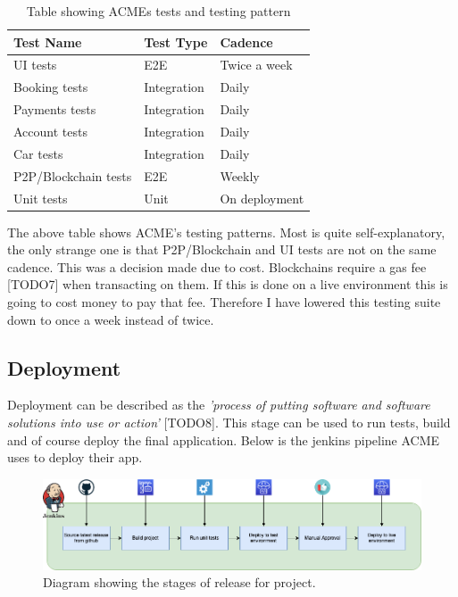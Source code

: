   \begin{table}[H]
    \centering
    \begin{tabular}{|l|l|l|}
      \hline
      \textbf{Test Name}    & \textbf{Test Type}  & \textbf{Cadence}  \\ \hline
      UI tests              & E2E                 & Twice a week      \\ \hline
      Booking tests         & Integration         & Daily             \\ \hline
      Payments tests        & Integration         & Daily             \\ \hline     
      Account tests         & Integration         & Daily             \\ \hline     
      Car tests             & Integration         & Daily             \\ \hline   
      P2P/Blockchain tests  & E2E                 & Weekly            \\ \hline 
      Unit tests            & Unit                & On deployment     \\ \hline    
    \end{tabular}
    \caption{Table showing ACMEs tests and testing pattern}
  \end{table}

  The above table shows ACME's testing patterns. Most is quite self-explanatory, the only strange one is that P2P/Blockchain and UI tests are not on 
  the same cadence. This was a decision made due to cost. Blockchains require a gas fee [TODO7] when transacting on them. If this is done on a live 
  environment this is going to cost money to pay that fee. Therefore I have lowered this testing suite down to once a week instead of twice.

  \subsection{Deployment}
  \label{sec:Deployment}

  Deployment can be described as the \textit{'process of putting software and software solutions into use or action'} [TODO8]. This stage can be
  used to run tests, build and of course deploy the final application. Below is the jenkins pipeline ACME uses to deploy their app.

  \begin{figure}[H]
    \centering
    \includegraphics[width=12cm]{assets/relasePipeline.drawio.png}
    \caption{Diagram showing the stages of release for project.}
    \label{fig:releasePipeline}
  \end{figure}


